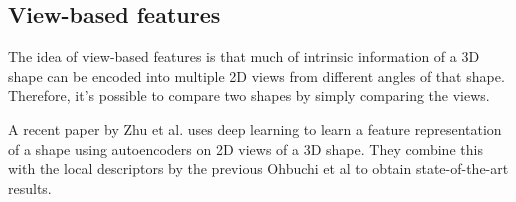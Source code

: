 \documentclass[../tech_report_1.tex]{subfiles}
\begin{document}
\subsection{View-based features}

The idea of view-based features is that much of intrinsic information of a 3D shape can be encoded into multiple 2D views from different angles of that shape. Therefore, it's possible to compare two shapes by simply comparing the views.

A recent paper by Zhu et al.\cite{zhu2016deep} uses deep learning to learn a feature representation of a shape using autoencoders on 2D views of a 3D shape. They combine this with the local descriptors by the previous Ohbuchi et al\cite{ohbuchi2008salient} to obtain state-of-the-art results. 
\end{document}
